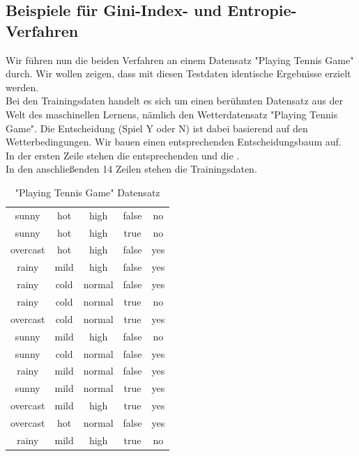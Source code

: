 \documentclass[12pt]{article}
\begin{document}
\subsection{Beispiele für Gini-Index- und Entropie-Verfahren }
%
Wir führen nun die beiden Verfahren an einem Datensatz "Playing Tennis Game" durch. Wir  wollen zeigen, dass mit diesen Testdaten identische Ergebnisse erzielt werden.\\
%
Bei den Trainingsdaten handelt es sich um einen berühmten Datensatz aus der Welt des maschinellen Lernens, nämlich den Wetterdatensatz "Playing Tennis Game". Die Entscheidung (Spiel Y oder N) ist dabei  basierend auf den Wetterbedingungen. Wir bauen einen entsprechenden  Entscheidungsbaum auf.\\
In der ersten Zeile stehen die entsprechenden {\color{red}{vier Bedingungen ("Features"): OUTLOOK, TEMP, HUMIDITY und WINDY}}   und die {\color{blue}{Zielvariable ("Label")}}  {\color{blue}{PLAY}}.\\
In den anschließenden 14 Zeilen stehen die Trainingsdaten.\\[0.2cm]
%
\renewcommand{\arraystretch}{1.2} %
\begin{table}[htp]
  \centering
  \caption{"Playing Tennis Game" Datensatz}
  \label{tab:Tennis-Tabelle}
  \begin{tabular}{|*{5}{c|}}
    \hline
    \color{red}{OUTLOOK} & \color{red}{TEMP} &  \color{red}{HUMIDITY} & \color{red}{WINDY} &    \color{blue}{PLAY} \\
    \hline
    sunny & hot & high & false & no \\
    \hline
    sunny & hot & high & true & no \\
    \hline
    overcast & hot & high & false & yes \\
    \hline
    rainy & mild & high & false & yes \\
    \hline
    rainy & cold & normal & false & yes \\
    \hline
    rainy & cold & normal & true & no \\
    \hline
    overcast & cold & normal & true & yes \\
    \hline
    sunny & mild & high & false & no \\
    \hline
    sunny & cold & normal & false & yes \\
    \hline
    rainy & mild & normal & false & yes  \\
    \hline
    sunny & mild & normal & true & yes \\
    \hline
    overcast & mild & high & true & yes \\
    \hline
    overcast & hot & normal & false & yes \\
    \hline
    rainy & mild & high & true & no \\
    \hline
  \end{tabular}
\end{table}\\[1.2 cm]
\end{document}
